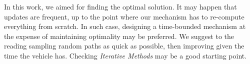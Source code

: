 \documentclass[pdflatex,sn-mathphys-num]{sn-jnl}%
\begin{document}
In this work, we aimed for finding the optimal solution. It may happen that updates are frequent, up to the point where our mechanism has to re-compute everything from scratch. In such case, designing a time-bounded mechanism at the expense of maintaining optimality may be preferred. We suggest to the reading sampling random paths as quick as possible, then improving given the time the vehicle has. Checking \textit{Iterative Methods} may be a good starting point.


\end{document}
